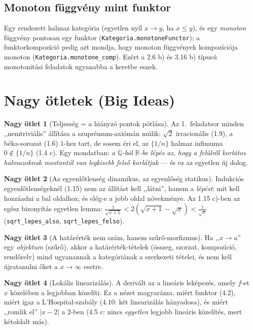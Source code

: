 \documentclass[11pt,a4paper]{article}
\newcommand{\lean}[1]{\texttt{\small #1}}
\newcommand{\R}{\mathbb{R}}
\newcommand{\Q}{\mathbb{Q}}
\theoremstyle{definition}
\newtheorem{bigidea}{Nagy ötlet}
\begin{document}
\subsection{Monoton függvény mint funktor}

Egy rendezett halmaz kategória (egyetlen nyíl $x\to y$, ha $x\le y$), és egy
\emph{monoton} függvény pontosan egy funktor
(\lean{Kategoria.monotoneFunctor}); a funktorkompozíció pedig azt mondja,
hogy monoton függvények kompozíciója monoton (\lean{Kategoria.monotone\_comp}).
Ezért a 2.6 b) és 3.16 b) típusú monotonitási feladatok ugyanabba a keretbe esnek.

\section{Nagy ötletek (Big Ideas)}

\begin{bigidea}[Teljesség = a hiányzó pontok pótlása]
Az 1.~feladatsor minden ,,nemtriviális'' állítása a szuprémum-axiómán múlik:
$\sqrt2$ irracionális (1.9), a béka-sorozat (1.6) $1$-hez tart, de sosem éri el,
az $\{1/n\}$ halmaz infimuma $0 \notin \{1/n\}$ (1.4 c). Egy mondatban:
\emph{a $\Q$-ból $\R$-be lépés az, hogy a felülről korlátos halmazoknak
mostantól van legkisebb felső korlátjuk} --- és ez az egyetlen új dolog.
\end{bigidea}

\begin{bigidea}[Az egyenlőtlenség dinamikus, az egyenlőség statikus]
Indukciós egyenlőtlenségeknél (1.15) nem az állítást kell ,,látni'', hanem a
\emph{lépést}: mit kell hozzáadni a bal oldalhoz, és elég-e a jobb oldal
növekménye. Az 1.15 c)-ben az egész bizonyítás egyetlen lemma:
$\frac{1}{\sqrt{x+1}} < 2(\sqrt{x+1}-\sqrt x) < \frac1{\sqrt x}$
(\lean{sqrt\_lepes\_also}, \lean{sqrt\_lepes\_felso}).
\end{bigidea}

\begin{bigidea}[A határérték nem szám, hanem szűrő-morfizmus]
Ha ,,$x\to a$'' egy \emph{objektum} (szűrő), akkor a határérték-tételek
(összeg, szorzat, kompozíció, rendőrelv) mind ugyanannak a kategóriának a
szerkezeti tételei, és nem kell újratanulni őket a $x\to\infty$ esetre.
\end{bigidea}

\begin{bigidea}[Lokális linearizálás]
A derivált az a lineáris leképezés, amely $f$-et $x$ közelében a legjobban
közelíti. Ez a nézet magyarázza, miért funktor (4.2), miért igaz a L'Hospital-szabály
(4.10: két linearizálás hányadosa), és miért ,,romlik el'' $|x-2|$ a $2$-ben
(4.5 c: nincs \emph{egyetlen} legjobb lineáris közelítés, mert kétoldalt más).
\end{bigidea}
\end{document}
